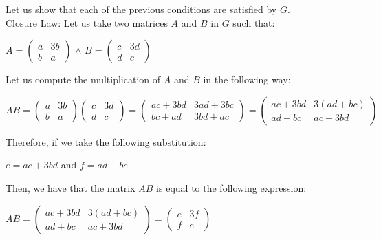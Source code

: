 \documentclass[a4paper,openany,11pt]{book}
\begin{document}
Let us show that each of the previous conditions are satisfied by $G$.\\

\underline{Closure Law:} Let us take two matrices $A$ and $B$ in $G$ such that:

\begin{center}
	$A = \left(\begin{array}{cc}
	a & 3b\\
	b & a
	\end{array}\right)$ \hspace{0.1cm} $\wedge$ \hspace{0.1cm} $B = \left(\begin{array}{cc}
		c & 3d\\
		d & c
	\end{array}\right)$
\end{center}

Let us compute the multiplication of $A$ and $B$ in the following way:

\begin{center}
	$AB = \left(\begin{array}{cc}
	a & 3b\\
	b & a
	\end{array}\right) \left(\begin{array}{cc}
	c & 3d\\
	d & c
	\end{array}\right) = \left(\begin{array}{cc}
	ac + 3bd & 3ad+3bc \\
	bc+ad & 3bd+ac
	\end{array}\right) = \left(\begin{array}{cc}
	ac + 3bd & 3(ad+bc) \\
	ad+bc & ac+3bd
	\end{array}\right)$
\end{center}

Therefore, if we take the following substitution:

\begin{center}
	$e = ac + 3bd$ \hspace{0.1cm} and \hspace{0.1cm} $f = ad+bc$
\end{center}

Then, we have that the matrix $AB$ is equal to the following expression:

\begin{center}
	$AB = \left(\begin{array}{cc}
	ac + 3bd & 3(ad+bc) \\
	ad+bc & ac+3bd
	\end{array}\right) = \left(\begin{array}{cc}
	e & 3f \\
	f & e
	\end{array}\right)$
\end{center}
\end{document}

